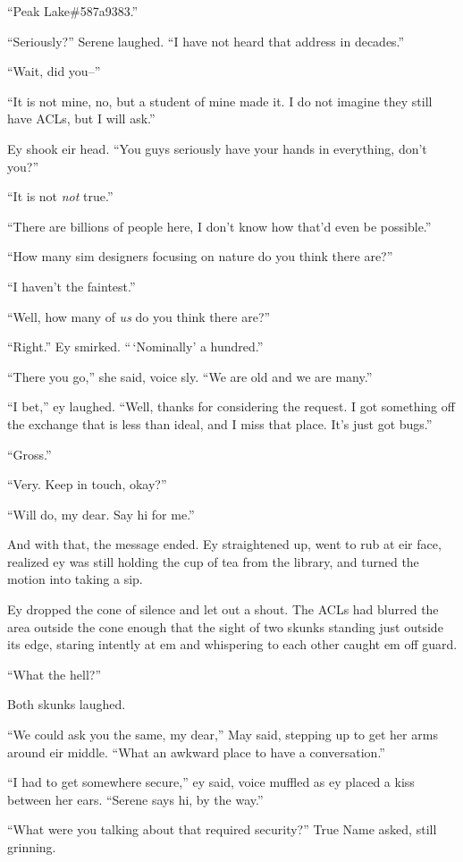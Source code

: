 ``Peak Lake\#587a9383.''

``Seriously?'' Serene laughed. ``I have not heard that address in decades.''

``Wait, did you--''

``It is not mine, no, but a student of mine made it. I do not imagine they still have ACLs, but I will ask.''

Ey shook eir head. ``You guys seriously have your hands in everything, don't you?''

``It is not \emph{not} true.''

``There are billions of people here, I don't know how that'd even be possible.''

``How many sim designers focusing on nature do you think there are?''

``I haven't the faintest.''

``Well, how many of \emph{us} do you think there are?''

``Right.'' Ey smirked. ``\,`Nominally' a hundred.''

``There you go,'' she said, voice sly. ``We are old and we are many.''

``I bet,'' ey laughed. ``Well, thanks for considering the request. I got something off the exchange that is less than ideal, and I miss that place. It's just got bugs.''

``Gross.''

``Very. Keep in touch, okay?''

``Will do, my dear. Say hi for me.''

And with that, the message ended. Ey straightened up, went to rub at eir face, realized ey was still holding the cup of tea from the library, and turned the motion into taking a sip.

Ey dropped the cone of silence and let out a shout. The ACLs had blurred the area outside the cone enough that the sight of two skunks standing just outside its edge, staring intently at em and whispering to each other caught em off guard.

``What the hell?''

Both skunks laughed.

``We could ask you the same, my dear,'' May said, stepping up to get her arms around eir middle. ``What an awkward place to have a conversation.''

``I had to get somewhere secure,'' ey said, voice muffled as ey placed a kiss between her ears. ``Serene says hi, by the way.''

``What were you talking about that required security?'' True Name asked, still grinning.

